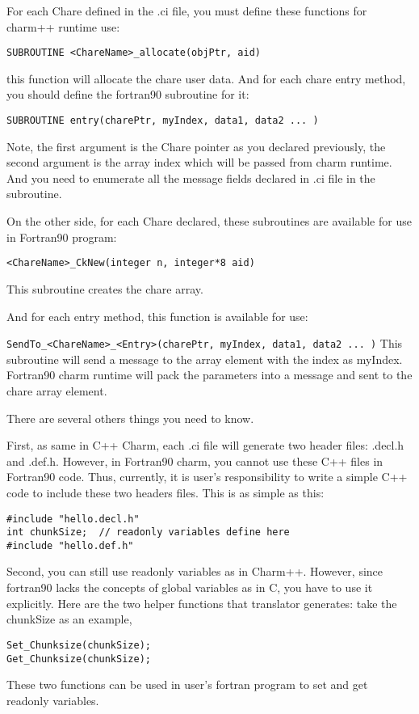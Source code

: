 \documentclass[11pt]{article}
\begin{document}
For each Chare defined in the .ci file, you must define these functions
for charm++ runtime use:

  \verb+SUBROUTINE <ChareName>_allocate(objPtr, aid)+

  this function will allocate the chare user data.
And for each chare entry method, you should define the fortran90 subroutine
for it:

  \verb+SUBROUTINE entry(charePtr, myIndex, data1, data2 ... )+

  Note, the first argument is the Chare pointer as you declared previously, the second argument is the array index which will be passed from charm runtime. And you need to enumerate all the message fields declared in .ci file in the 
subroutine.

On the other side, for each Chare declared, these subroutines are available
for use in Fortran90 program:

  \verb+<ChareName>_CkNew(integer n, integer*8 aid)+

  This subroutine creates the chare array.

And for each entry method, this function is available for use:

  \verb+SendTo_<ChareName>_<Entry>(charePtr, myIndex, data1, data2 ... )+
  This subroutine will send a message to the array element with the index
as myIndex. Fortran90 charm runtime will pack the parameters into a message
and sent to the chare array element.

There are several others things you need to know.

First, as same in C++ Charm, each .ci file will generate two header files:
.decl.h and .def.h. However, in Fortran90 charm, you cannot use these C++
files in Fortran90 code. Thus, currently, it is user's responsibility to 
write a simple C++ code to include these two headers files. This is as simple
as this:

\begin{verbatim}
#include "hello.decl.h"
int chunkSize; 	// readonly variables define here
#include "hello.def.h"
\end{verbatim}

Second, you can still use readonly variables as in Charm++. However, since
fortran90 lacks the concepts of global variables as in C, you have to use it
explicitly. Here are the two helper functions that translator generates:
take the chunkSize as an example,
\begin{verbatim}
Set_Chunksize(chunkSize);
Get_Chunksize(chunkSize);
\end{verbatim}
These two functions can be used in user's fortran program to set and get 
readonly variables.
\end{document}
